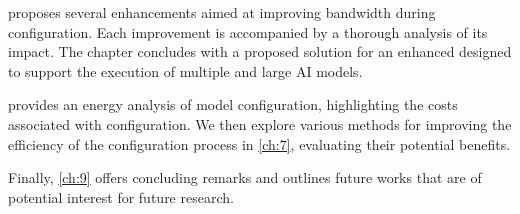  proposes several \confignoc{} enhancements aimed at improving bandwidth during configuration.
Each improvement is accompanied by a thorough analysis of its impact.
The chapter concludes with a proposed solution for an enhanced \confignoc{} designed to support the execution of multiple and large AI models.

 provides an energy analysis of model configuration, highlighting the costs associated with configuration. 
We then explore various methods for improving the efficiency of the configuration process in \cref{ch:7}, evaluating their potential benefits.


Finally, \cref{ch:9} offers concluding remarks and outlines future works that are of potential interest for future research.




